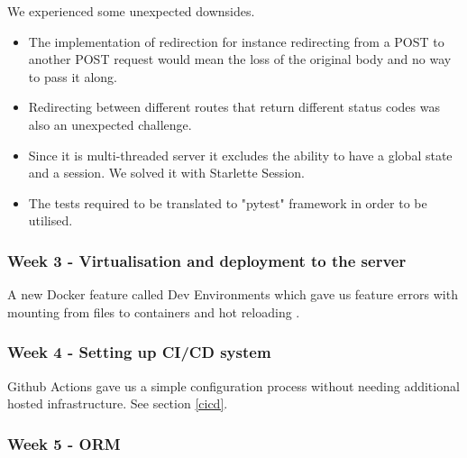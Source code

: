 \documentclass{article}
\begin{document}
We experienced some unexpected downsides.
\begin{itemize}

    \item The implementation of redirection for instance redirecting from a POST to another POST request would mean the loss of the original body and no way to pass it along. 
    \item Redirecting between different routes that return different status codes was also an unexpected challenge. 
    \item Since it is multi-threaded server it excludes the ability to have a global state and a session. We solved it with Starlette Session.
    \item The tests required to be translated to "pytest" framework in order to be utilised.
\end{itemize}

\subsubsection{Week 3 - Virtualisation and deployment to the server}

A new Docker feature called Dev Environments which gave us feature errors with mounting from files to containers and hot reloading .  

\subsubsection{Week 4 - Setting up CI/CD system }

Github Actions gave us a simple configuration process without needing additional hosted infrastructure. See section \ref{cicd}. 

\subsubsection{Week 5 - ORM }
\end{document}
